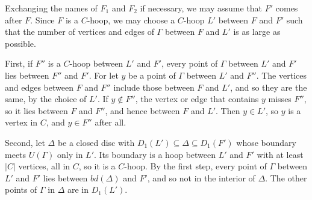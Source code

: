 {Exchanging the names of $F_1$ and $F_2$ if necessary, we may assume that $F'$ comes after $F$. Since $F$ is a $C$-hoop, we may choose a $C$-hoop $L'$ between $F$ and $F'$ such that the number of vertices and edges of $\Gamma$ between $F$ and $L'$ is as large as possible.

First, if $F''$ is a $C$-hoop between $L'$ and $F'$, every point of $\Gamma$ between $L'$ and $F'$ lies between $F''$ and $F'$. For let $y$ be a point of $\Gamma$ between $L'$ and $F''$. The vertices and edges between $F$ and $F''$ include those between $F$ and $L'$, and so they are the same, by the choice of $L'$. If $y \notin F''$, the vertex or edge that contains $y$ misses $F''$, so it lies between $F$ and $F''$, and hence between $F$ and $L'$. Then $y \in L'$, so $y$ is a vertex in $C$, and $y \in F''$ after all.

Second, let $\Delta$ be a closed disc with $D_1(L') \subseteq \Delta \subseteq D_1(F')$ whose boundary meets $U(\Gamma)$ only in $L'$. Its boundary is a hoop between $L'$ and $F'$ with at least $|C|$ vertices, all in $C$, so it is a $C$-hoop. By the first step, every point of $\Gamma$ between $L'$ and $F'$ lies between $bd(\Delta)$ and $F'$, and so not in the interior of $\Delta$. The other points of $\Gamma$ in $\Delta$ are in $D_1(L')$.

}
